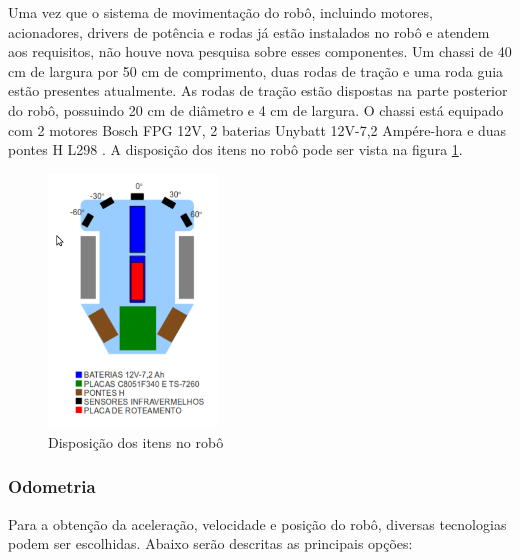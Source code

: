 Uma vez que o sistema de movimentação do robô, incluindo motores, acionadores, drivers de potência e rodas já estão instalados no robô e atendem aos requisitos, não houve nova pesquisa sobre esses componentes. Um chassi de 40 cm de largura por 50 cm de comprimento, duas rodas de tração e uma roda guia estão presentes atualmente. As rodas de tração estão dispostas na parte posterior do robô, possuindo 20 cm de diâmetro e 4 cm de largura. O chassi está equipado com 2 motores Bosch FPG 12V, 2 baterias Unybatt 12V-7,2 Ampére-hora e duas pontes H L298 \cite{bellator_2012}. A disposição dos itens no robô pode ser vista na figura \ref{fig:disposicao_bellator_2012}.

\begin{figure}[H]
\centering
\includegraphics[width=0.4\textwidth]{./figuras/disposicao-robo.png}
\caption{Disposição dos itens no robô}
\label{fig:disposicao_bellator_2012}
\end{figure}

\subsubsection{Odometria}

Para a obtenção da aceleração, velocidade e posição do robô, diversas tecnologias podem ser escolhidas. Abaixo serão descritas as principais opções:

